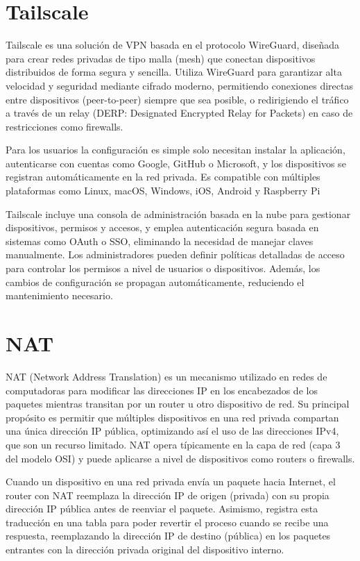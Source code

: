 \section{Tailscale}  
    Tailscale es una solución de VPN basada en el protocolo WireGuard, diseñada para crear redes privadas de tipo malla (mesh) que conectan dispositivos distribuidos de forma segura y sencilla. Utiliza WireGuard para garantizar alta velocidad y seguridad mediante cifrado moderno, permitiendo conexiones directas entre dispositivos (peer-to-peer) siempre que sea posible, o redirigiendo el tráfico a través de un relay (DERP: Designated Encrypted Relay for Packets) en caso de restricciones como firewalls.
    
   Para los usuarios la configuración es simple solo necesitan instalar la aplicación, autenticarse con cuentas como Google, GitHub o Microsoft, y los dispositivos se registran automáticamente en la red privada. Es compatible con múltiples plataformas como Linux, macOS, Windows, iOS, Android y Raspberry Pi
   
   Tailscale incluye una consola de administración basada en la nube para gestionar dispositivos, permisos y accesos, y emplea autenticación segura basada en sistemas como OAuth o SSO, eliminando la necesidad de manejar claves manualmente. Los administradores pueden definir políticas detalladas de acceso para controlar los permisos a nivel de usuarios o dispositivos. Además, los cambios de configuración se propagan automáticamente, reduciendo el mantenimiento necesario. 

\section{NAT}
NAT (Network Address Translation) es un mecanismo utilizado en redes de computadoras para modificar las direcciones IP en los encabezados de los paquetes mientras transitan por un router u otro dispositivo de red. Su principal propósito es permitir que múltiples dispositivos en una red privada compartan una única dirección IP pública, optimizando así el uso de las direcciones IPv4, que son un recurso limitado. NAT opera típicamente en la capa de red (capa 3 del modelo OSI) y puede aplicarse a nivel de dispositivos como routers o firewalls.

Cuando un dispositivo en una red privada envía un paquete hacia Internet, el router con NAT reemplaza la dirección IP de origen (privada) con su propia dirección IP pública antes de reenviar el paquete. Asimismo, registra esta traducción en una tabla para poder revertir el proceso cuando se recibe una respuesta, reemplazando la dirección IP de destino (pública) en los paquetes entrantes con la dirección privada original del dispositivo interno.

